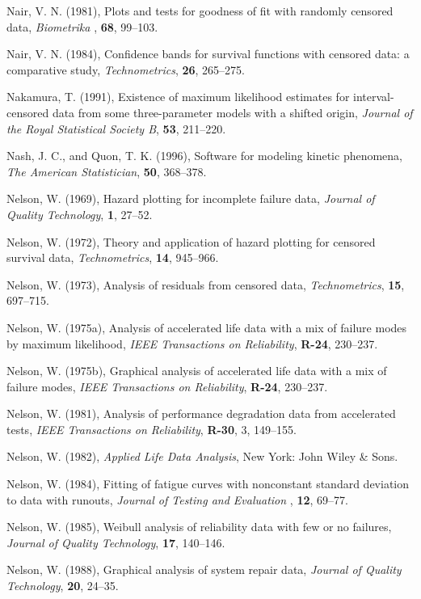 \begin{thebibliography}{999}
Nair, V. N. (1981), Plots and tests for goodness of fit with randomly
censored data, {\em Biometrika }, {\bf 68}, 99--103.

Nair, V. N. (1984), Confidence bands for survival functions with
censored data: a comparative study, {\em Technometrics}, {\bf 26},
265--275.

Nakamura, T. (1991), Existence of maximum likelihood estimates for
interval-censored data from some three-parameter models with a shifted
origin, {\em Journal of the Royal Statistical Society B}, {\bf 53},
211--220.

Nash, J. C., and Quon, T. K. (1996), Software for modeling kinetic
phenomena, {\em The American Statistician}, {\bf 50}, 368--378.

Nelson, W. (1969), Hazard plotting for incomplete failure data, {\em
Journal of Quality Technology}, {\bf 1}, 27--52.

Nelson, W. (1972), Theory and application of hazard plotting for
censored survival data, {\em Technometrics}, {\bf 14}, 945--966.

Nelson, W. (1973), Analysis of residuals from censored data,
{\em Technometrics}, {\bf 15}, 697--715.

Nelson, W. (1975a), Analysis of accelerated life data with a mix of
failure modes by maximum likelihood,
{\em IEEE Transactions on Reliability}, {\bf R-24}, 230--237.

Nelson, W. (1975b), Graphical analysis of accelerated life data with a
mix of failure modes, {\em IEEE Transactions on Reliability}, {\bf
R-24}, 230--237.

Nelson, W. (1981), Analysis of performance degradation data from
accelerated tests, {\em IEEE Transactions on Reliability}, {\bf
R-30}, 3, 149--155.

Nelson, W. (1982), {\em Applied Life Data Analysis}, New York: John
Wiley \& Sons.

Nelson, W. (1984), Fitting of fatigue curves with nonconstant standard
deviation to data with runouts, {\em Journal of Testing and Evaluation
}, {\bf 12}, 69--77.

Nelson, W. (1985), Weibull analysis of reliability data with few or no
failures, {\em Journal of Quality Technology}, {\bf 17}, 140--146.

Nelson, W. (1988), Graphical analysis of system repair data,
{\em Journal of Quality Technology}, {\bf 20}, 24--35.


\end{thebibliography}
